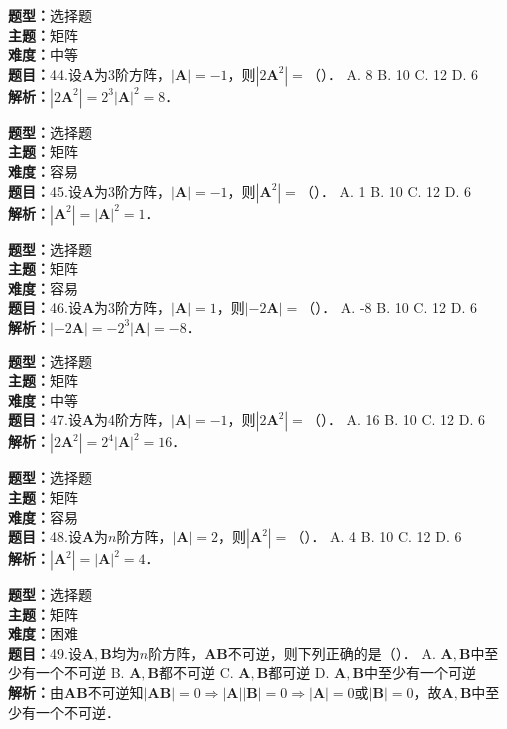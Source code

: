 \documentclass{ctexart}
\newenvironment{question}[5]{%
	\noindent\textbf{题型：}#1\\
	\textbf{主题：}#2\\
	\textbf{难度：}#3\\
	\textbf{题目：}#4\\
	\textbf{解析：}#5\\
	\vspace{1em}
}{}
\begin{document}
	\begin{question}
		{选择题}
		{矩阵}
		{中等}
		{44.设\(\mathbf{A}\)为3阶方阵，\(|\mathbf{A}|=-1\)，则\(\left|2 \mathbf{A}^2\right|=\)（）．
			A. 8
			B. 10
			C. 12
			D. 6}
		{\(\left|2 \mathbf{A}^2\right|=2^3|\mathbf{A}|^2=8\)．}
	\end{question}
	
	\begin{question}
		{选择题}
		{矩阵}
		{容易}
		{45.设\(\mathbf{A}\)为3阶方阵，\(|\mathbf{A}|=-1\)，则\(\left|\mathbf{A}^2\right|=\)（）．
			A. 1
			B. 10
			C. 12
			D. 6}
		{\(\left|\mathbf{A}^2\right|=|\mathbf{A}|^2=1\)．}
	\end{question}
	
	\begin{question}
		{选择题}
		{矩阵}
		{容易}
		{46.设\(\mathbf{A}\)为3阶方阵，\(|\mathbf{A}|=1\)，则\(|-2 \mathbf{A}|=\)（）．
			A. -8
			B. 10
			C. 12
			D. 6}
		{\(|-2 \mathbf{A}|=-2^3|\mathbf{A}|=-8\)．}
	\end{question}
	
	\begin{question}
		{选择题}
		{矩阵}
		{中等}
		{47.设\(\mathbf{A}\)为4阶方阵，\(|\mathbf{A}|=-1\)，则\(\left|2 \mathbf{A}^2\right|=\)（）．
			A. 16
			B. 10
			C. 12
			D. 6}
		{\(\left|2 \mathbf{A}^2\right|=2^4|\mathbf{A}|^2=16\)．}
	\end{question}
	
	\begin{question}
		{选择题}
		{矩阵}
		{容易}
		{48.设\(\mathbf{A}\)为\(n\)阶方阵，\(|\mathbf{A}|=2\)，则\(\left|\mathbf{A}^2\right|=\)（）．
			A. 4
			B. 10
			C. 12
			D. 6}
		{\(\left|\mathbf{A}^2\right|=|\mathbf{A}|^2=4\)．}
	\end{question}
	
	\begin{question}
		{选择题}
		{矩阵}
		{困难}
		{49.设\(\mathbf{A}, \mathbf{B}\)均为\(n\)阶方阵，\(\mathbf{A B}\)不可逆，则下列正确的是（）．
			A. \(\mathbf{A}, \mathbf{B}\)中至少有一个不可逆
			B. \(\mathbf{A}, \mathbf{B}\)都不可逆
			C. \(\mathbf{A}, \mathbf{B}\)都可逆
			D. \(\mathbf{A}, \mathbf{B}\)中至少有一个可逆}
		{由\(\mathbf{A B}\)不可逆知\(|\mathbf{A B}|=0 \Rightarrow|\mathbf{A}||\mathbf{B}|=0 \Rightarrow|\mathbf{A}|=0\)或\(|\mathbf{B}|=0\)，故\(\mathbf{A}, \mathbf{B}\)中至少有一个不可逆．}
	\end{question}
	
\end{document}
